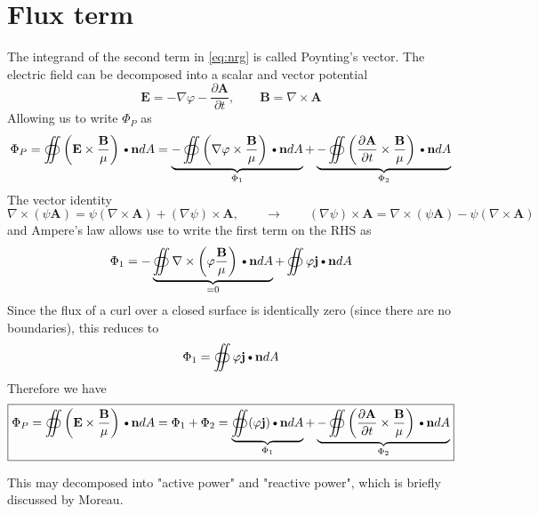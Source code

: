 \documentclass[11pt]{article}
\newcommand{\A}{\mathbf{A}}
\newcommand{\B}{\mathbf{B}}
\newcommand{\PD}{\partial}
\newcommand{\BM}{\frac{\mathbf{B}}{\mu}}
\newcommand{\J}{\mathbf{j}}
\newcommand{\E}{\mathbf{E}}
\newcommand{\N}{\mathbf{n}}
\newcommand{\DOT}{\text{\textbullet}}
\begin{document}
\section{Flux term}
The integrand of the second term in \ref{eq:nrg} is called Poynting's vector. The electric field can be decomposed into a scalar and vector potential
\begin{equation}
	\E = -\nabla \varphi - \frac{\PD \A}{\PD t}, \qquad \B = \nabla \times \A
\end{equation}
Allowing us to write $\Phi_P$ as
\begin{equation}
	\Phi_P = \oiint \left( \E \times \BM \right) \DOT \N dA =
	\underbrace{- \oiint \left( \nabla \varphi \times \BM \right) \DOT \N dA}_{\Phi_1} +
	\underbrace{- \oiint \left( \frac{\PD \A}{\PD t} \times \BM \right) \DOT \N dA}_{\Phi_2}
\end{equation}
The vector identity
\begin{equation}
	\nabla \times (\psi \A) = \psi (\nabla \times \A) + (\nabla \psi) \times \A
	, \qquad \rightarrow \qquad
	(\nabla \psi) \times \A = \nabla \times (\psi \A) - \psi (\nabla \times \A)
\end{equation}
and Ampere's law allows use to write the first term on the RHS as
\begin{equation}
	\Phi_1 = - \underbrace{\oiint \nabla \times \left(\varphi \BM \right) \DOT \N dA}_{= 0}
	+ \oiint \varphi \J \DOT \N dA
\end{equation}
Since the flux of a curl over a closed surface is identically zero (since there are no boundaries), this reduces to
\begin{equation}
	\Phi_1 = \oiint \varphi \J \DOT \N dA
\end{equation}
Therefore we have
\begin{equation}
	\boxed{
	\Phi_P = \oiint \left( \E \times \BM \right) \DOT \N dA = \Phi_1 + \Phi_2 =
	\underbrace{\oiint (\varphi \J) \DOT \N dA}_{\Phi_1} +
	\underbrace{- \oiint \left( \frac{\PD \A}{\PD t} \times \BM \right) \DOT \N dA}_{\Phi_2}
	}
\end{equation}

This may decomposed into "active power" and "reactive power", which is briefly discussed by Moreau.
\end{document}
